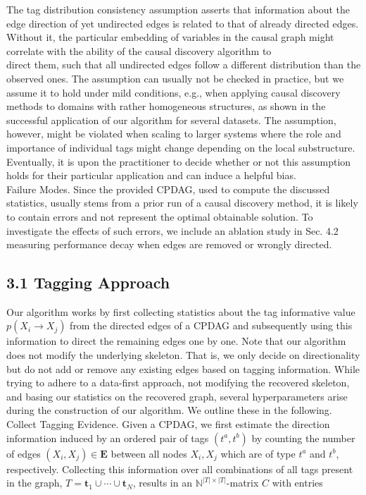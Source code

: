 \documentclass[10pt]{article}
\begin{document}
The tag distribution consistency assumption asserts that information about the edge direction of yet undirected edges is related to that of already directed edges. Without it, the particular embedding of variables in the causal graph might correlate with the ability of the causal discovery algorithm to\\
direct them, such that all undirected edges follow a different distribution than the observed ones. The assumption can usually not be checked in practice, but we assume it to hold under mild conditions, e.g., when applying causal discovery methods to domains with rather homogeneous structures, as shown in the successful application of our algorithm for several datasets. The assumption, however, might be violated when scaling to larger systems where the role and importance of individual tags might change depending on the local substructure. Eventually, it is upon the practitioner to decide whether or not this assumption holds for their particular application and can induce a helpful bias.\\
Failure Modes. Since the provided CPDAG, used to compute the discussed statistics, usually stems from a prior run of a causal discovery method, it is likely to contain errors and not represent the optimal obtainable solution. To investigate the effects of such errors, we include an ablation study in Sec. 4.2 measuring performance decay when edges are removed or wrongly directed.

\subsection*{3.1 Tagging Approach}
Our algorithm works by first collecting statistics about the tag informative value $p\left(X_{i} \rightarrow X_{j}\right)$ from the directed edges of a CPDAG and subsequently using this information to direct the remaining edges one by one. Note that our algorithm does not modify the underlying skeleton. That is, we only decide on directionality but do not add or remove any existing edges based on tagging information. While trying to adhere to a data-first approach, not modifying the recovered skeleton, and basing our statistics on the recovered graph, several hyperparameters arise during the construction of our algorithm. We outline these in the following.\\
Collect Tagging Evidence. Given a CPDAG, we first estimate the direction information induced by an ordered pair of tags $\left(t^{a}, t^{b}\right)$ by counting the number of edges $\left(X_{i}, X_{j}\right) \in \mathbf{E}$ between all nodes $X_{i}, X_{j}$ which are of type $t^{a}$ and $t^{b}$, respectively. Collecting this information over all combinations of all tags present in the graph, $T=\mathbf{t}_{1} \cup \cdots \cup \mathbf{t}_{N}$, results in an $\mathbb{N}^{|T| \times|T|}$-matrix $C$ with entries
\end{document}
